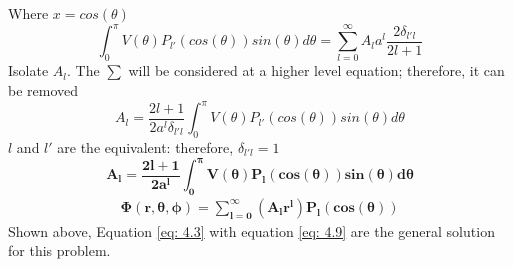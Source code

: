 \documentclass[12pt]{article}
\begin{document}
    Where $x=cos(\theta)$
    \begin{equation} \label{eq: 4.7}
        \int_0^{\pi} V(\theta) P_{l'}(cos(\theta)) sin(\theta) d\theta = \sum_{l=0}^\infty A_l a^l \frac{2 \delta_{l'l}}{2l + 1}
    \end{equation}
    Isolate $A_l$. The $\sum$ will be considered at a higher level equation; therefore, it can be removed
    \begin{equation} \label{eq: 4.8}
        A_l = \frac{2l + 1}{2 a^l \delta_{l'l}}\int_0^{\pi} V(\theta) P_{l'}(cos(\theta)) sin(\theta) d\theta
    \end{equation}
    $l$ and $l'$ are the equivalent: therefore, $\delta_{l'l} = 1$
    \begin{equation} \label{eq: 4.9}
        \boxed{\boldsymbol{A_l = \frac{2l + 1}{2 a^l }\int_0^{\pi} V(\theta) P_l(cos(\theta)) sin(\theta) d\theta}}
    \end{equation}
    \begin{gather*}
        \boxed{\boldsymbol{\Phi(r,\theta, \phi) = \sum_{l=0}^{\infty} (A_l r^l) P_l (cos(\theta))}}
    \end{gather*}
    Shown above, Equation \ref{eq: 4.3} with equation \ref{eq: 4.9} are the general solution for this problem. 
\end{document}
